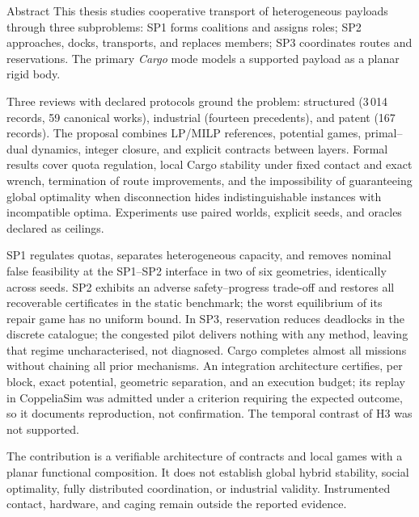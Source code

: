 \begin{viuabstract}{Abstract}
This thesis studies cooperative transport of heterogeneous payloads through
three subproblems: SP1 forms coalitions and assigns roles; SP2 approaches,
docks, transports, and replaces members; SP3 coordinates routes and reservations. The primary \emph{Cargo} mode models a supported
payload as a planar rigid body.

Three reviews with declared protocols ground the problem: structured
(3\,014 records, 59 canonical works), industrial (fourteen precedents), and
patent (167 records). The proposal combines LP/MILP references, potential games, primal--dual
dynamics, integer closure, and explicit contracts between layers. Formal results cover quota regulation, local Cargo
stability under fixed contact and exact wrench, termination of
route improvements, and the impossibility of guaranteeing global optimality when
disconnection hides indistinguishable instances with incompatible optima.
Experiments use paired worlds, explicit seeds, and oracles declared as ceilings.

SP1 regulates quotas, separates heterogeneous capacity, and removes nominal
false feasibility at the SP1--SP2 interface in two of six geometries,
identically across seeds. SP2 exhibits an adverse safety--progress trade-off and
restores all recoverable certificates in the static benchmark; the worst
equilibrium of its repair game has no uniform bound. In SP3, reservation reduces
deadlocks in the discrete catalogue; the congested pilot delivers nothing with
any method, leaving that regime uncharacterised, not diagnosed.
Cargo completes almost all missions without chaining all prior mechanisms. An
integration architecture certifies, per block, exact potential, geometric
separation, and an execution budget; its replay in CoppeliaSim was admitted
under a criterion requiring the expected outcome, so it documents reproduction,
not confirmation. The temporal contrast of H3 was not supported.

The contribution is a verifiable architecture of contracts and local games with
a planar functional composition. It does not establish global hybrid stability,
social optimality, fully distributed coordination, or industrial validity.
Instrumented contact, hardware, and caging remain outside the reported evidence.

\end{viuabstract}

\clearpage
